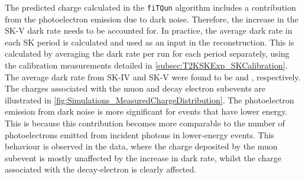 The predicted charge calculated in the \texttt{fiTQun} algorithm includes a contribution from the photoelectron emission due to dark noise. Therefore, the increase in the SK-V dark rate needs to be accounted for. In practice, the average dark rate in each SK period is calculated and used as an input in the reconstruction. This is calculated by averaging the dark rate per run for each period separately, using the calibration measurements detailed in \autoref{subsec:T2KSKExp_SKCalibration}. The average dark rate from SK-IV and SK-V were found to be  and , respectively. The charges associated with the muon and decay electron subevents are illustrated in \autoref{fig:Simulations_MeasuredChargeDistribution}. The photoelectron emission from dark noise is more significant for events that have lower energy. This is because this contribution becomes more comparable to the number of photoelectrons emitted from incident photons in lower-energy events. This behaviour is observed in the data, where the charge deposited by the muon subevent is mostly unaffected by the increase in dark rate, whilst the charge associated with the decay-electron is clearly affected.

